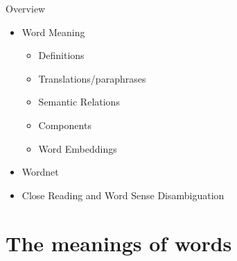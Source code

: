 \documentclass{beamer}
\begin{document}
\begin{frame}{Overview}

\begin{itemize}
\item Word Meaning
  \begin{itemize}
  \item Definitions
  \item Translations/paraphrases
  \item Semantic Relations
  \item Components
  \item Word Embeddings
  \end{itemize}
\item Wordnet
\item Close Reading and Word Sense Disambiguation
\end{itemize}

\end{frame}


\section{The meanings of words}
\end{document}
